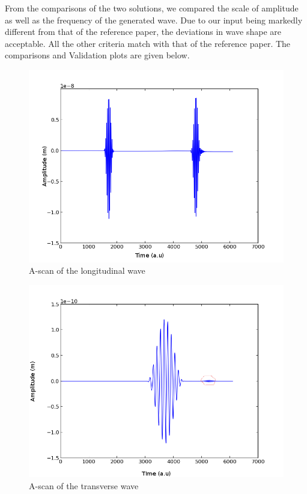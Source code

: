 From the comparisons of the two solutions, we compared the scale of amplitude as well as the frequency of the generated wave. Due to our input being markedly different from that of the reference paper, the deviations in wave shape are acceptable. All the other criteria match with that of the reference paper. The comparisons and Validation plots are given below.


\begin{figure}[ht]
\begin{center}
\includegraphics[scale=0.7]{images/chapter_3/final_longitudinal.png}
\caption{A-scan of the longitudinal wave}
\end{center}
\end{figure}

\begin{figure}[ht]
\begin{center}
\includegraphics[scale=0.5]{images/chapter_3/final_transverse.png}
\caption{A-scan of the transverse wave}
\end{center}
\end{figure}

